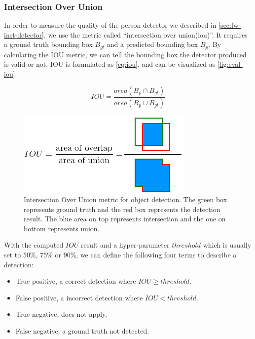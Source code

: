 \subsubsection{Intersection Over Union}
\label{sec:Eval-iou}

In order to measure the quality of the person detector we described in
\autoref{sec:fw-inst-detector}, we use the metric called ``intersection over
union(\acrshort{iou})''.
It requires a ground truth bounding box $B_{gt}$ and a predicted bounding box
$B_{p}$. By calculating the IOU metric, we can tell the bounding box the
detector produced is valid or not. IOU is formulated as \autoref{eq:iou}, and can be
visualized as \autoref{fig:eval-iou}.


\begin{equation}
\label{eq:iou}
\mathit{IOU} = \frac{area(B_p \cap B_{gt})}{area(B_p \cup B_{gt})}
\end{equation}

\begin{figure}
    \begin{center}
        \includegraphics[scale=0.7]{figures/eval_iou.png}
    \end{center}
    \caption[Intersection Over Union metric for object detection]
    {Intersection Over Union metric for object detection.
        The green box represents ground truth and the red box represents
        the detection result. The blue area on top represents intersection and
        the one on bottom represents union.}
    \label{fig:eval-iou}
\end{figure}

With the computed $\mathit{IOU}$ result and a hyper-parameter
$\mathit{threshold}$ which is usually set to $50\%$, $75\%$ or $90\%$,
we can define the following four terms to describe a detection:

\begin{itemize}
    \item True positive, a correct detection where $\mathit{IOU} \geq
    \mathit{threshold}$.
    \item False positive, a incorrect detection where $\mathit{IOU} <
    \mathit{threshold}$.
    \item True negative, does not apply.
    \item False negative, a ground truth not detected.
\end{itemize}

